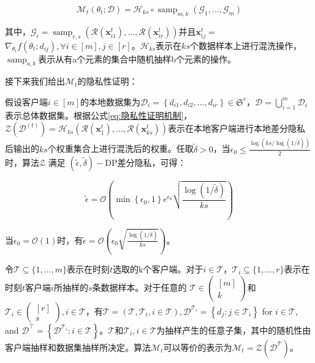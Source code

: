 \begin{equation}\label{eq:隐私性证明机制}
\mathcal{M}_{t}\left(\theta_{t} ; \mathcal{D}\right)=\mathcal{H}_{k s} \circ \operatorname{samp}_{m, k}\left(\mathcal{G}_{1}, \ldots, \mathcal{G}_{m}\right)
\end{equation}

其中，$\mathcal{G}_{i}=\operatorname{samp}_{r, s}\left(\mathcal{R}\left(\boldsymbol{x}_{i 1}^{t}\right), \ldots, \mathcal{R}\left(\boldsymbol{x}_{i r}^{t}\right)\right)$并且$\boldsymbol{x}_{i j}^{t}=$$\nabla_{\theta_{t}} f\left(\theta_{t} ; d_{i j}\right), \forall i \in[m], j \in[r]$。$\mathcal{H}_{k s}$表示在$k s$个数据样本上进行混洗操作， $\operatorname{samp}_{a, b}$表示从有a个元素的集合中随机抽样b个元素的操作。

接下来我们给出$\mathcal{M}_{t}$的隐私性证明：

假设客户端$i \in[m]$的本地数据集为$\mathcal{D}_{i}=\left\{d_{i 1}, d_{i 2}, \ldots, d_{i r}\right\} \in \mathfrak{S}^{r}$，$\mathcal{D}=\bigcup_{i=1}^{m} \mathcal{D}_{i}$表示总体数据集。根据公式\ref{eq:隐私性证明机制}，$\mathcal{Z}\left(\mathcal{D}^{(t)}\right)=\mathcal{H}_{k s}\left(\mathcal{R}\left(\boldsymbol{x}_{1}^{t}\right), \ldots, \mathcal{R}\left(\boldsymbol{x}_{k s}^{t}\right)\right)$表示在本地客户端进行本地差分隐私后输出的$ks$个权重集合上进行混洗后的权重。任取$\tilde{\delta}>0$，当$\epsilon_{0} \leq \frac{\log (k s / \log (1 / \tilde{\delta}))}{2}$时，算法$\mathcal{Z}$ 满足 $(\tilde{\epsilon}, \tilde{\delta})-\mathrm{DP}$差分隐私，可得：

\begin{equation}\label{eq:隐私性证明机制2}
\tilde{\epsilon}=\mathcal{O}\left(\min \left\{\epsilon_{0}, 1\right\} e^{\epsilon_{0}} \sqrt{\frac{\log (1 / \tilde{\delta})}{k s}}\right)
\end{equation}

当$\epsilon_{0}=\mathcal{O}(1)$时，有$\tilde{\epsilon}=\mathcal{O}\left(\epsilon_{0} \sqrt{\frac{\log (1 / \tilde{\delta})}{k s}}\right)$。

令$\mathcal{T} \subseteq\{1, \ldots, m\}$表示在时刻$t$选取的k个客户端。对于$i \in \mathcal{T}$，$\mathcal{T}_{i} \subseteq\{1, \ldots, r\}$表示在时刻$t$客户端$i$所抽样的$s$条数据样本。对于任意的 $\mathcal{T} \in\left(\begin{array}{c}{[m]} \\ k\end{array}\right)$和$\mathcal{T}_{i} \in\left(\begin{array}{c}{[r]} \\ s\end{array}\right), i \in \mathcal{T}$，有$\overline{\mathcal{T}}=\left(\mathcal{T}, \mathcal{T}_{i}, i \in \mathcal{T}\right), \mathcal{D}^{\mathcal{T}_{i}}=\left\{d_{j}: j \in \mathcal{T}_{i}\right\}$ for $i \in \mathcal{T}$, and $\mathcal{D}^{\bar{\top}}=\left\{\mathcal{D}^{\mathcal{T}_{i}}: i \in \mathcal{T}\right\}$。$\mathcal{T}$和$\mathcal{T}_{i}, i \in \mathcal{T}$为抽样产生的任意子集，其中的随机性由客户端抽样和数据集抽样所决定。算法$\mathcal{M}_{t}$可以等价的表示为$\mathcal{M}_{t}=\mathcal{Z}\left(\mathcal{D}^{\overline{\mathcal{T}}}\right)$。

